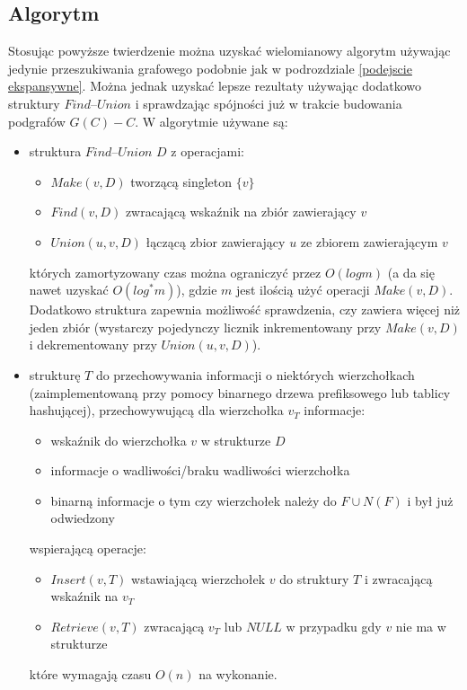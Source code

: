 \documentclass{pracamgr}
\begin{document}
   \subsection{Algorytm}
    Stosując powyższe twierdzenie można uzyskać wielomianowy algorytm używając jedynie przeszukiwania grafowego
    podobnie jak w podrozdziale \ref{podejscie ekspansywne}. Można jednak uzyskać lepsze rezultaty używając dodatkowo struktury $Find$--$Union$ i sprawdzając
    spójności już w trakcie budowania podgrafów $G(C)-C$.\newline
    W algorytmie używane są:
    \begin{itemize}[noitemsep,topsep=4pt]
     \item struktura $Find$--$Union$ $D$ z operacjami:
      \begin{itemize}[noitemsep,topsep=0pt]
       \item $Make(v,D)$ tworzącą singleton $\{v\}$
       \item $Find(v,D)$ zwracającą wskaźnik na zbiór zawierający $v$
       \item $Union(u,v,D)$ łączącą zbior zawierający $u$ ze zbiorem zawierającym $v$
      \end{itemize}
      których zamortyzowany czas można ograniczyć przez $O(log m)$ (a da się nawet uzyskać $O(log^*m)$), gdzie $m$ jest ilością użyć
      operacji $Make(v,D)$.
      Dodatkowo struktura zapewnia możliwość sprawdzenia, czy zawiera więcej niż jeden zbiór (wystarczy pojedynczy licznik inkrementowany przy
      $Make(v,D)$ i dekrementowany przy $Union(u,v,D)$).
      \vspace*{4pt}
     \item strukturę $T$ do przechowywania informacji o niektórych wierzchołkach
     (zaimplementowaną przy pomocy binarnego drzewa prefiksowego lub tablicy hashującej),
      przechowywującą dla wierzchołka $v_T$ informacje:
      \begin{itemize}[noitemsep,topsep=0pt]
       \item wskaźnik do wierzchołka $v$ w strukturze $D$
       \item informacje o wadliwości/braku wadliwości wierzchołka
       \item binarną informacje o tym czy wierzchołek należy do $F\cup N(F)$ i był już odwiedzony
      \end{itemize}
      wspierającą operacje:
      \begin{itemize}[noitemsep,topsep=0pt]
       \item $Insert(v,T)$ wstawiającą wierzchołek $v$ do struktury $T$ i zwracającą wskaźnik na $v_T$
       \item $Retrieve(v,T)$ zwracającą $v_T$ lub $NULL$ w przypadku gdy $v$ nie ma w strukturze
      \end{itemize}
      które wymagają czasu $O(n)$ na wykonanie.
    \end{itemize}
    
\end{document}
